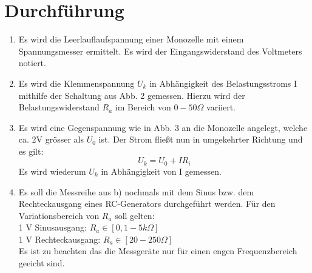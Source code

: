 \section{Durchführung}
\label{sec:Durchführung}

\renewcommand{\labelenumi}{\alph{enumi})}
\begin{enumerate}
    \item Es wird die Leerlauflaufspannung einer Monozelle mit einem Spannungsmesser ermittelt.
    Es wird der Eingangswiderstand des Voltmeters notiert.

    \item Es wird die Klemmenspannung $U_k$ in Abhängigkeit des Belastungsstroms I mithilfe
    der Schaltung aus Abb. 2 gemessen.
    Hierzu wird der Belastungswiderstand $R_a$ im Bereich von $ 0-50 \Omega$ variiert.

    \item Es wird eine Gegenspannung wie in Abb. 3 an die Monozelle angelegt, welche ca. 2V
    grösser als $U_0$ ist. Der Strom fließt nun in umgekehrter Richtung und es gilt:
    \begin{equation}
	    U_k = U_0 + IR_i
    \end{equation}
    Es wird wiederum $U_k$ in Abhängigkeit von I gemessen.

    \item Es soll die Messreihe aus b) nochmals mit dem Sinus bzw. dem
    Rechteckausgang eines RC-Generators durchgeführt werden. Für den Variationsbereich
    von $R_a$ soll gelten:\\
    1 V Sinusausgang: $R_a \in [0,1 - 5 k\Omega]$\\
    1 V Rechteckausgang: $R_a \in [20 -250 \Omega]$\\
    Es ist zu beachten das die Messgeräte nur für einen engen Frequenzbereich geeicht sind.
\end{enumerate}
